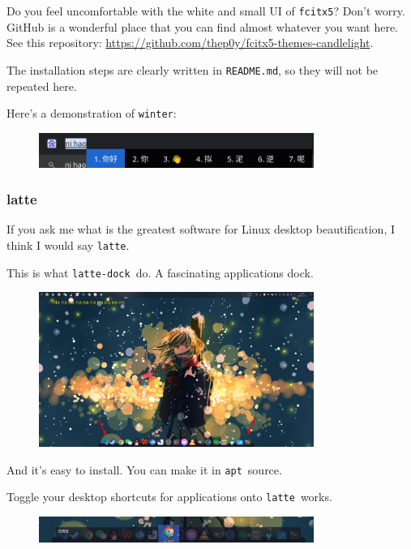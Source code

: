 \documentclass[12pt]{ctexart}
\begin{document}
Do you feel uncomfortable with the white and small UI of
\texttt{fcitx5}? Don't worry. GitHub is a wonderful
place that you can find almost whatever you want here. See this
repository: \url{https://github.com/thep0y/fcitx5-themes-candlelight}.

The installation steps are clearly written in \texttt{README.md}, so
they will not be repeated here.

Here's a demonstration of \texttt{winter}:

\begin{figure}[H]
    \centering
    \includegraphics[width=0.8\textwidth,keepaspectratio]{assets/Linux/3.2 Decorate your own garden/7.png}
\end{figure}

\subsubsection*{\textbf{latte}}

If you ask me what is the greatest software for Linux desktop
beautification, I think I would say \texttt{latte}.

This is what \texttt{latte-dock}\ do. A fascinating applications dock.

\begin{figure}[H]
    \centering
    \includegraphics[width=0.8\textwidth,keepaspectratio]{assets/Linux/3.2 Decorate your own garden/8.png}
\end{figure}

And it's easy to install. You can make it in
\texttt{apt}\ source.

Toggle your desktop shortcuts for applications onto \texttt{latte}\
works.

\begin{figure}[H]
    \centering
    \includegraphics[width=0.8\textwidth,keepaspectratio]{assets/Linux/3.2 Decorate your own garden/9.png}
\end{figure}
\end{document}
